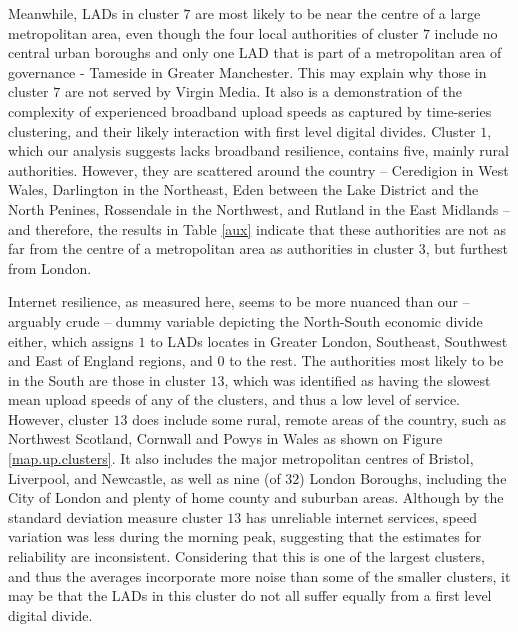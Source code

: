 \documentclass[Royal,times,sageh]{sagej}
\begin{document}
Meanwhile, LADs in cluster \(7\) are most likely to be near the centre
of a large metropolitan area, even though the four local authorities of
cluster \(7\) include no central urban boroughs and only one LAD that is
part of a metropolitan area of governance - Tameside in Greater
Manchester. This may explain why those in cluster \(7\) are not served
by Virgin Media. It also is a demonstration of the complexity of
experienced broadband upload speeds as captured by time-series
clustering, and their likely interaction with first level digital
divides. Cluster \(1\), which our analysis suggests lacks broadband
resilience, contains five, mainly rural authorities. However, they are
scattered around the country -- Ceredigion in West Wales, Darlington in
the Northeast, Eden between the Lake District and the North Penines,
Rossendale in the Northwest, and Rutland in the East Midlands -- and
therefore, the results in Table \ref{aux} indicate that these
authorities are not as far from the centre of a metropolitan area as
authorities in cluster \(3\), but furthest from London.

Internet resilience, as measured here, seems to be more nuanced than our
-- arguably crude -- dummy variable depicting the North-South economic
divide either, which assigns \(1\) to LADs locates in Greater London,
Southeast, Southwest and East of England regions, and \(0\) to the rest.
The authorities most likely to be in the South are those in cluster
\(13\), which was identified as having the slowest mean upload speeds of
any of the clusters, and thus a low level of service. However, cluster
\(13\) does include some rural, remote areas of the country, such as
Northwest Scotland, Cornwall and Powys in Wales as shown on Figure
\ref{map.up.clusters}. It also includes the major metropolitan centres
of Bristol, Liverpool, and Newcastle, as well as nine (of \(32\)) London
Boroughs, including the City of London and plenty of home county and
suburban areas. Although by the standard deviation measure cluster
\(13\) has unreliable internet services, speed variation was less during
the morning peak, suggesting that the estimates for reliability are
inconsistent. Considering that this is one of the largest clusters, and
thus the averages incorporate more noise than some of the smaller
clusters, it may be that the LADs in this cluster do not all suffer
equally from a first level digital divide.
\end{document}
